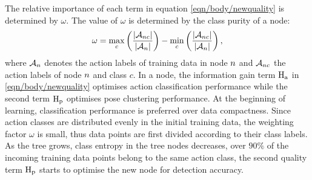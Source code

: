 The relative importance of each term in equation \ref{eqn/body/newquality} is determined by $\omega$. The value of $\omega$ is determined by the class purity of a node: 
\begin{equation}
	\omega = \max_{c}\left( \frac{|\mathcal{A}_{n c}|}{|\mathcal{A}_{n}|}\right)- \min_{c} \left(\frac{|\mathcal{A}_{n c}|}{| \mathcal{A}_{n}|}\right), 
\end{equation} 
where $\mathcal{A}_{n}$ denotes the action labels of training data in node $n$ and $\mathcal{A}_{n c}$ the action labels of node $n$ and class $c$.  
In a node, the information gain term $\mathrm{H_{a}}$ in \ref{eqn/body/newquality} optimises action classification performance while the second term $\mathrm{H_{p}}$ optimises pose clustering performance. 
At the beginning of learning, classification performance is preferred over data compactness. Since action classes are distributed evenly in the initial training data, the weighting factor $\omega$ is small, thus data points are first divided according to their class labels. As the tree grows, class entropy in the tree nodes decreases, \eg over $90\%$ of the incoming training data points belong to the same action class, the second quality term $\mathrm{H_{p}}$ starts to optimise the new node for detection accuracy.  

